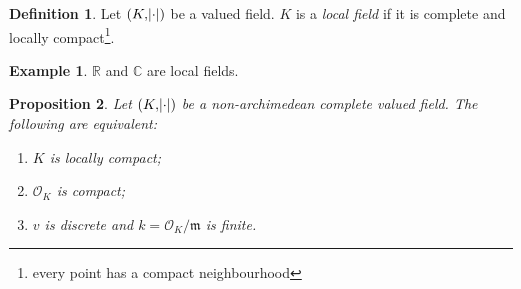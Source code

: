 \documentclass[11pt]{article}
\theoremstyle{definition}
\newtheorem{definition}{Definition}[subsection]
\newtheorem*{example}{Example}
\theoremstyle{plain}
\newtheorem{proposition}[definition]{Proposition}
\theoremstyle{remark}
\newcommand{\RR}{\mathbb{R}}
\newcommand{\CC}{\mathbb{C}}
\newcommand{\cO}{\mathcal{O}}
\newcommand{\fm}{\mathfrak{m}}
\begin{document}
\begin{definition}\label{def:7_1}
    Let $(K, \abs{\cdot})$ be a valued field. $K$ is a \emph{local field} if it is complete and locally compact\footnote{every point has a compact neighbourhood}.
\end{definition}

\begin{example}
    $\RR$ and $\CC$ are local fields.
\end{example}

\begin{proposition}\label{prop:7_2}
    Let $(K, \abs{\cdot})$ be a non-archimedean complete valued field. The following are equivalent:
    \begin{enumerate}
        \item $K$ is locally compact;
        \item $\cO_K$ is compact;
        \item $v$ is discrete and $k = \cO_K / \fm$ is finite.
    \end{enumerate}
\end{proposition}
\end{document}
